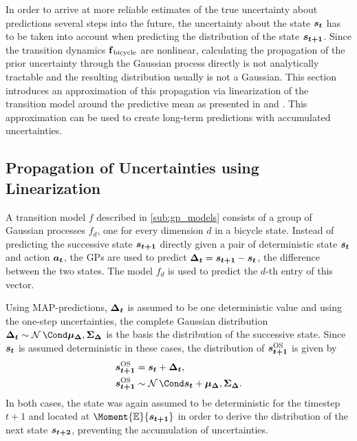 In order to arrive at more reliable estimates of the true uncertainty about predictions several steps into the future, the uncertainty about the state $\bm{s_t}$ has to be taken into account when predicting the distribution of the state $\bm{s_{t+1}}$.
Since the transition dynamics $\operatorname{\operatorname{\mathbf{f}}_{\text{bicycle}}}$ are nonlinear, calculating the propagation of the prior uncertainty through the Gaussian process directly is not analytically tractable and the resulting distribution usually is not a Gaussian.
This section introduces an approximation of this propagation via linearization of the transition model around the predictive mean as presented in \cite{ko_gp-bayesfilters:_2009} and \cite{ deisenroth_gaussian_2015}.
This approximation can be used to create long-term predictions with accumulated uncertainties.

\subsection{Propagation of Uncertainties using Linearization}
\label{sub:linearization}
A transition model $f$ described in \cref{sub:gp_models} consists of a group of Gaussian processes $f_d$, one for every dimension $d$ in a bicycle state.
Instead of predicting the successive state $\bm{s_{t+1}}$ directly given a pair of deterministic state $\bm{s_t}$ and action $\bm{a_t}$, the GPs are used to predict $\bm{\Delta_t} = \bm{s_{t+1}} - \bm{s_t}$, the difference between the two states.
The model $f_d$ is used to predict the $d$-th entry of this vector.

Using MAP-predictions, $\bm{\Delta_t}$ is assumed to be one deterministic value and using the one-step uncertainties, the complete Gaussian distribution $\rv{\Delta_t} \sim \Gaussian{\mat{\mu_\Delta}, \mat{\Sigma_\Delta}}$ is the basis the distribution of the successive state.
Since $\bm{s_t}$ is assumed deterministic in these cases, the distribution of $\bm{s_{t+1}}^{\text{OS}}$ is given by
\begin{align}
    \os{\rv{s_{t+1}}} &= \mat{s_t} + \rv{\Delta_t}, \\
    \os{\rv{s_{t+1}}} &\sim \Gaussian{\mat{s_t} + \mat{\mu_\Delta}, \mat{\Sigma_\Delta}}.
\end{align}
In both cases, the state was again assumed to be deterministic for the timestep $t+1$ and located at $\Moment{\E}{\rv{s_{t+1}}}$ in order to derive the distribution of the next state $\bm{s_{t+2}}$, preventing the accumulation of uncertainties.


